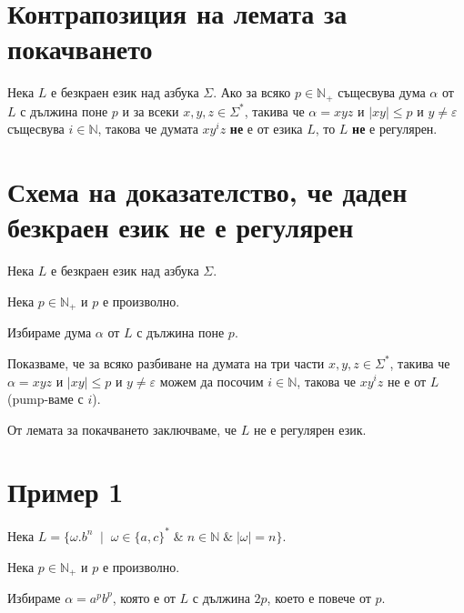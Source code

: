 \documentclass[12pt]{article}
\begin{document}
\section{Контрапозиция на лемата за покачването}
Нека \(L\) е безкраен език над азбука \(\Sigma\). Ако за всяко \(p \in \mathbb{N}_+\) същесвува дума \(\alpha\) от \(L\) с дължина поне \(p\) и за всеки \(x, y, z \in \Sigma^*\), такива че \(\alpha = xyz\) и \(|xy| \leq p\) и \(y \neq \varepsilon\) същесвува \(i \in \mathbb N\), такова че думата \(xy^iz\) \textbf{не} е от езика \(L\), то \(L\) \textbf{не} е регулярен.

\section{Схема на доказателство, че даден безкраен език не е регулярен}
Нека \(L\) е безкраен език над азбука \(\Sigma\).

\vspace*{5mm}

Нека \(p \in \mathbb{N}_+\) и \(p\) е произволно.

\vspace*{5mm}

Избираме дума \(\alpha\) от \(L\) с дължина поне \(p\).

\vspace*{5mm}

Показваме, че за всяко разбиване на думата на три части \(x, y, z \in \Sigma^*\), такива че \(\alpha = xyz\) и \(|xy| \leq p\) и \(y \neq \varepsilon\) можем да посочим \(i \in \mathbb N\),
такова че \(xy^iz\) не е от \(L\) (pump-ваме с \(i\)).

\vspace*{5mm}

От лемата за покачването заключваме, че \(L\) не е регулярен език.

\section{Пример 1}

Нека \(L = \{\omega.b^n \;\mid\; \omega \in \{a, c\}^* \;\&\; n \in \mathbb{N} \;\&\; |\omega| = n\}\).

\vspace*{5mm}

Нека \(p \in \mathbb{N}_+\) и \(p\) е произволно.

\vspace*{5mm}

Избираме \(\alpha = a^pb^p\), която е от \(L\) с дължина \(2p\), което е повече от \(p\).
\end{document}
